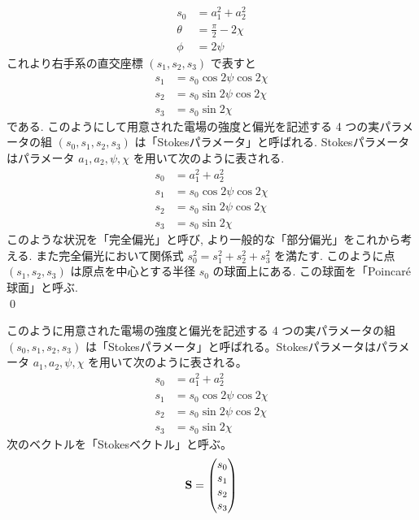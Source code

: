 \documentclass[uplatex,dvipdfmx,a4paper,11pt]{jlreq}
\makeatletter
\theoremstyle{definition}
\renewenvironment{proof}[1][\proofname]{\par
  \normalfont
  \topsep6\p@\@plus6\p@ \trivlist
  \item[\hskip\labelsep{\bfseries #1}\@addpunct{\bfseries}]\ignorespaces\quad\par
}{%
  \qed\endtrivlist\@endpefalse
}
\renewcommand\proofname{証明}
\makeatother
\begin{document}
\begin{proof}
  \begin{align}
    s_0    & = a_1^2 + a_2^2         \\
    \theta & = \frac{\pi}{2} - 2\chi \\
    \phi   & = 2\psi
  \end{align}
  これより右手系の直交座標 $(s_1, s_2, s_3)$ で表すと
  \begin{align}
    s_1 & = s_0\cos2\psi\cos2\chi \\
    s_2 & = s_0\sin2\psi\cos2\chi \\
    s_3 & = s_0\sin2\chi
  \end{align}
  である. このようにして用意された電場の強度と偏光を記述する 4 つの実パラメータの組 $(s_0, s_1, s_2, s_3)$ は「Stokesパラメータ」と呼ばれる. Stokesパラメータはパラメータ $a_1, a_2, \psi, \chi$ を用いて次のように表される.
  \begin{align}
    s_0 & = a_1^2 + a_2^2                        \\
    s_1 & = s_0\cos2\psi\cos2\chi \label{s1 def} \\
    s_2 & = s_0\sin2\psi\cos2\chi \label{s2 def} \\
    s_3 & = s_0\sin2\chi \label{s3 def}
  \end{align}
  このような状況を「完全偏光」と呼び, より一般的な「部分偏光」をこれから考える. また完全偏光において関係式 $s_0^2 = s_1^2 + s_2^2 + s_3^2$ を満たす. このように点 $(s_1, s_2, s_3)$ は原点を中心とする半径 $s_0$ の球面上にある. この球面を「Poincaré 球面」と呼ぶ. \\
\end{proof}

\begin{definition}
  このように用意された電場の強度と偏光を記述する 4 つの実パラメータの組 $(s_0, s_1, s_2, s_3)$ は「Stokesパラメータ」と呼ばれる。Stokesパラメータはパラメータ $a_1, a_2, \psi, \chi$ を用いて次のように表される。
  \begin{align}
    s_0 & = a_1^2 + a_2^2           \\
    s_1 & = s_0\cos 2\psi\cos 2\chi \\
    s_2 & = s_0\sin 2\psi\cos 2\chi \\
    s_3 & = s_0\sin 2\chi
  \end{align}
  次のベクトルを「Stokesベクトル」と呼ぶ。
  \begin{align}
    \vb{S} = \mqty(s_0 \\ s_1 \\ s_2 \\ s_3)
  \end{align}
\end{definition}
\end{document}
